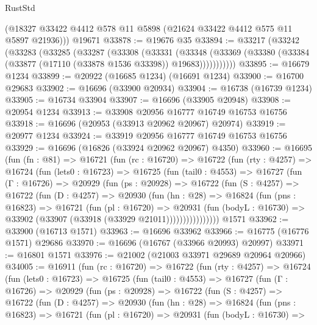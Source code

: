 \begin{lexlean}{RustStd}
\begin{coremodule}
      (@18327 @33422 @4412 @578 @11 @5898 (@21624 @33422 @4412 @575 @11 @5897 @21936)))
    @19671
@33878 := @19676 @35
@33894 := @33217
    (@33242
      (@33283
        (@33285
          (@33287
            (@33308
              (@33331
                (@33348
                  (@33369 (@33380 (@33384 (@33877 (@17110 (@33878 @1536 @33398)) @19683)))))))))))
@33895 := @16679 @1234
@33899 := @20922 (@16685 @1234) (@16691 @1234)
@33900 := @16700 @29683
@33902 := @16696 (@33900 @20934)
@33904 := @16738 (@16739 @1234)
@33905 := @16734 @33904
@33907 := @16696 (@33905 @20948)
@33908 := @20954 @1234
@33913 := @33908 @20956 @16777 @16749 @16753 @16756
@33918 := @16696 (@20953 (@33913 @20962 @20967) @20974)
@33919 := @20977 @1234
@33924 := @33919 @20956 @16777 @16749 @16753 @16756
@33929 := @16696 (@16826 (@33924 @20962 @20967) @4350)
@33960 := @16695
    (fun (fn : @81) =>
    @16721
      (fun (rc : @16720) =>
      @16722
        (fun (rty : @4257) =>
        @16724
          (fun (lets0 : @16723) =>
          @16725
            (fun (tail0 : @4553) =>
            @16727
              (fun (Γ : @16726) =>
              @20929
                (fun (ps : @20928) =>
                @16722
                  (fun (S : @4257) =>
                  @16722
                    (fun (D : @4257) =>
                    @20930
                      (fun (hn : @28) =>
                      @16824
                        (fun (pns : @16823) =>
                        @16721
                          (fun (pl : @16720) =>
                          @20931
                            (fun (bodyL : @16730) =>
                            @33902 (@33907 (@33918 (@33929 @21011))))))))))))))))
    @1571
@33962 := @33900 (@16713 @1571)
@33963 := @16696 @33962
@33966 := @16775 (@16776 @1571) @29686
@33970 := @16696 (@16767 (@33966 @20993) @20997)
@33971 := @16801 @1571
@33976 := @21002 (@21003 @33971 @29689 @20964 @20966)
@34005 := @16911
    (fun (rc : @16720) =>
    @16722
      (fun (rty : @4257) =>
      @16724
        (fun (lets0 : @16723) =>
        @16725
          (fun (tail0 : @4553) =>
          @16727
            (fun (Γ : @16726) =>
            @20929
              (fun (ps : @20928) =>
              @16722
                (fun (S : @4257) =>
                @16722
                  (fun (D : @4257) =>
                  @20930
                    (fun (hn : @28) =>
                    @16824
                      (fun (pns : @16823) =>
                      @16721
                        (fun (pl : @16720) =>
                        @20931
                          (fun (bodyL : @16730) =>

\end{coremodule}
\end{lexlean}
